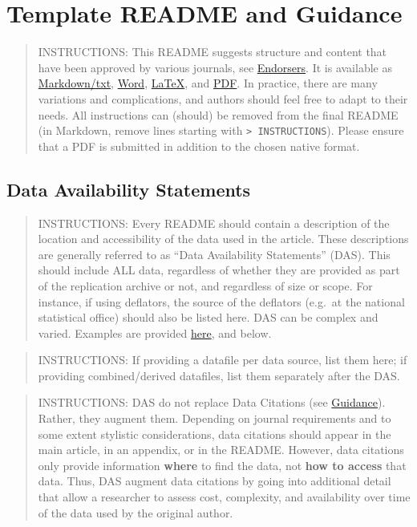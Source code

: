 \documentclass[
]{article}
\author{}
\date{}
\begin{document}
\hypertarget{template-readme-and-guidance}{%
\section{Template README and
Guidance}\label{template-readme-and-guidance}}

\begin{quote}
INSTRUCTIONS: This README suggests structure and content that have been
approved by various journals, see \href{Endorsers.md}{Endorsers}. It is
available as
\href{https://github.com/social-science-data-editors/template_README/blob/master/template-README.md}{Markdown/txt},
\href{templates/README.docx}{Word}, \href{templates/README.tex}{LaTeX},
and \href{templates/README.pdf}{PDF}. In practice, there are many
variations and complications, and authors should feel free to adapt to
their needs. All instructions can (should) be removed from the final
README (in Markdown, remove lines starting with
\texttt{\textgreater{}\ INSTRUCTIONS}). Please ensure that a PDF is
submitted in addition to the chosen native format.
\end{quote}

\hypertarget{data-availability-statements}{%
\subsection{Data Availability
Statements}\label{data-availability-statements}}

\begin{quote}
INSTRUCTIONS: Every README should contain a description of the location
and accessibility of the data used in the article. These descriptions
are generally referred to as ``Data Availability Statements'' (DAS).
This should include ALL data, regardless of whether they are provided as
part of the replication archive or not, and regardless of size or scope.
For instance, if using deflators, the source of the deflators (e.g.~at
the national statistical office) should also be listed here. DAS can be
complex and varied. Examples are provided
\href{Requested_information_dcas.md}{here}, and below.
\end{quote}

\begin{quote}
INSTRUCTIONS: If providing a datafile per data source, list them here;
if providing combined/derived datafiles, list them separately after the
DAS.
\end{quote}

\begin{quote}
INSTRUCTIONS: DAS do not replace Data Citations (see
\href{Data_citation_guidance.md}{Guidance}). Rather, they augment them.
Depending on journal requirements and to some extent stylistic
considerations, data citations should appear in the main article, in an
appendix, or in the README. However, data citations only provide
information \textbf{where} to find the data, not \textbf{how to access}
that data. Thus, DAS augment data citations by going into additional
detail that allow a researcher to assess cost, complexity, and
availability over time of the data used by the original author.
\end{quote}
\end{document}
